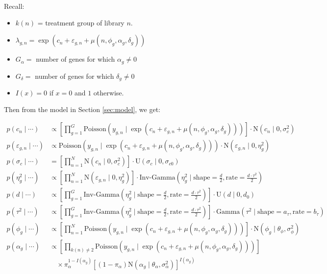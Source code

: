 \documentclass{article}\usepackage{graphicx, color}
\providecommand{\e}{\varepsilon}
\begin{document}
\begin{flushleft}
Recall:

\begin{itemize}
\item  $k(n)$ = treatment group of library $n$.
\item $\lambda_{g, n} = \exp(c_n + \e_{g, n} + \mu(n, \phi_g, \alpha_g, \delta_g))$ 
\item $G_\alpha = $ number of genes for which $\alpha_g \ne 0$
\item $G_\delta = $ number of genes for which $\delta_g \ne 0$
\item $I(x) = 0$ if $x = 0$ and $1$ otherwise.
\end{itemize}

 Then from the model in Section \ref{sec:model}, we get: 

\begin{align*}
p(c_n \mid \cdots) &\propto \left [ \prod_{g = 1}^G \text{Poisson}(y_{g, n} \mid \exp(c_n + \e_{g, n} + \mu(n, \phi_g, \alpha_g, \delta_g))) \right ] \cdot  \text{N}(c_n \mid 0, \sigma_c^2) \\
p(\e_{g, n} \mid \cdots) &\propto \text{Poisson}(y_{g, n} \mid \exp(c_n + \e_{g, n} + \mu(n, \phi_g, \alpha_g, \delta_g))) \cdot \text{N}(\e_{g, n} \mid 0, \eta_g^2) \\
p \left (\sigma_c \mid \cdots \right ) &= \left [ \prod_{n = 1}^N \text{N}(c_n \mid 0, \sigma_c^2) \right ] \cdot \text{U}(\sigma_c \mid 0, \sigma_{c0}) \\
p(\eta_g^2 \mid \cdots) &\propto \left [ \prod_{n = 1}^N \text{N}(\e_{g, n} \mid 0, \eta_g^2) \right ] \cdot \text{Inv-Gamma} \left ( \eta_g^2 \mid \text{shape} = \frac{d}{2}, \text{rate} = \frac{d \cdot \tau^2}{2} \right ) \\ 
p(d \mid \cdots) &\propto \left [ \prod_{g = 1}^G \text{Inv-Gamma} \left ( \eta_g^2 \mid \text{shape} = \frac{d}{2}, \text{rate} = \frac{d \cdot \tau^2}{2} \right ) \right ] \cdot \text{U}(d \mid 0, d_0) \\ 
p(\tau^2 \mid \cdots) &\propto \left [ \prod_{g = 1}^G \text{Inv-Gamma} \left ( \eta_g^2 \mid \text{shape} = \frac{d}{2}, \text{rate} = \frac{d \cdot \tau^2}{2} \right ) \right ] \cdot \text{Gamma}(\tau^2 \mid \text{shape} = a_\tau, \text{rate} = b_\tau) \\
p(\phi_g \mid \cdots) &\propto \left [ \prod_{n = 1}^N \text{Poisson}(y_{g, n} \mid \exp(c_n + \e_{g, n} + \mu(n, \phi_g, \alpha_g, \delta_g))) \right ] \cdot \text{N}(\phi_g \mid \theta_\phi, \sigma_\phi^2) \\
p(\alpha_g \mid \cdots) &\propto \left [ \prod_{k(n) \ne 2} \text{Poisson}(y_{g, n} \mid \exp(c_n + \e_{g, n} + \mu(n, \phi_g, \alpha_g, \delta_g))) \right ] \\
& \quad \times \pi_\alpha^{1-I(\alpha_g)}[(1- \pi_\alpha)\text{N}(\alpha_g \mid \theta_\alpha, \sigma_\alpha^2)]^{I(\alpha_g)}
\end{align*}


\end{flushleft}
\end{document}
